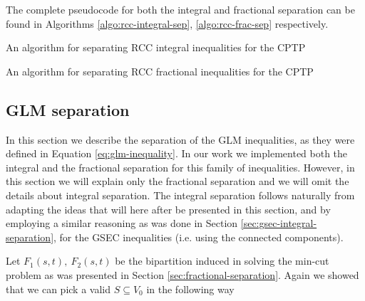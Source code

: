 The complete pseudocode for both the integral and fractional separation can be found in Algorithms \ref{algo:rcc-integral-sep}, \ref{algo:rcc-frac-sep} respectively.

\begin{algorithm}
	\caption{An algorithm for separating RCC integral inequalities for the CPTP}
	\label{algo:rcc-integral-sep}
	
\end{algorithm}

\begin{algorithm}
	\caption{An algorithm for separating RCC fractional inequalities for the CPTP}
	\label{algo:rcc-frac-sep}
	
\end{algorithm}

\subsection{GLM separation}
\label{sec:impl-glm-separation}

In this section we describe the separation of the GLM inequalities, as they were defined in Equation \eqref{eq:glm-inequality}.
In our work we implemented both the integral and the fractional separation for this family of inequalities.
However, in this section we will explain only the fractional separation and we will omit the details about integral separation.
The integral separation follows naturally from adapting the ideas that will here after be presented in this section, and by employing a similar reasoning as was done in Section \ref{sec:gsec-integral-separation}, for the GSEC inequalities (i.e. using the connected components).

Let $F_1(s, t),\ F_2(s, t)$ be the bipartition induced in solving the min-cut problem as was presented in Section \ref{sec:fractional-separation}.
Again we showed that we can pick a valid $S \subseteq V_0$ in the following way


